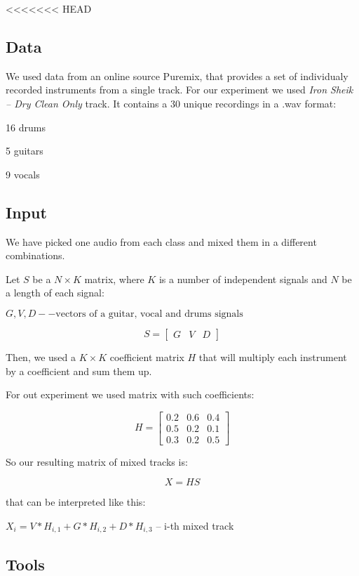 \documentclass[../main.tex]{subfiles} %
\begin{document}
<<<<<<< HEAD
\subsection{Data}

We used data from an online source Puremix, that provides a set of individualy recorded instruments from a single track. For our experiment we used \textit{Iron Sheik -- Dry Clean Only} track. It contains a 30 unique recordings in a .wav format:
\begin{list}{--}{spacing}
	\item 16 drums
	\item 5 guitars
	\item 9 vocals
\end{list}

\subsection{Input}


We have picked one audio from each class and mixed them in a different combinations.

Let $S$ be a $N \times K$ matrix, where $K$ is a number of independent signals and $N$ be a length of each signal:


$G, V, D --\text{vectors of a guitar, vocal and drums signals}$

$$S = \begin{bmatrix}
G & V & D
\end{bmatrix}$$

Then, we used a $K \times K$ coefficient matrix $H$ that will multiply each instrument by a coefficient and sum them up.

For out experiment we used matrix with such coefficients:

$$H = \begin{bmatrix}
0.2 & 0.6 & 0.4 \\
0.5 & 0.2 & 0.1 \\
0.3 & 0.2 & 0.5
\end{bmatrix}$$

So our resulting matrix of mixed tracks is:

$$X = H S$$

that can be interpreted like this:

$X_i = V * H_{i, 1} + G * H_{i, 2} + D * H_{i, 3} $ -- i-th mixed track


\subsection{Tools}
\end{document}
